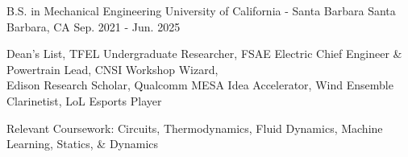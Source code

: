 


\begin{cventries}

\cventry
{B.S. in Mechanical Engineering} %
{University of California - Santa Barbara} %
{Santa Barbara, CA} %
{Sep. 2021 - Jun. 2025} %
{ %
\begin{cvitems}
\item {Dean's List, TFEL Undergraduate Researcher, FSAE Electric Chief Engineer \& Powertrain Lead, CNSI Workshop Wizard,  \\ Edison Research Scholar, Qualcomm MESA Idea Accelerator,  Wind Ensemble Clarinetist, LoL Esports Player}
\item {Relevant Coursework: Circuits, Thermodynamics, Fluid Dynamics, Machine Learning, Statics, \& Dynamics}
\end{cvitems}
}





\end{cventries}